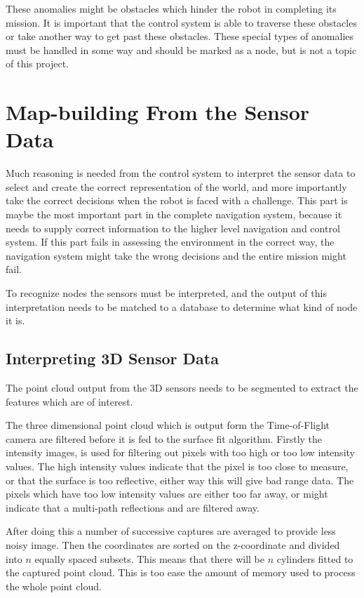 These anomalies might be obstacles which hinder the robot in completing its mission. It is
important that the control system is able to traverse these obstacles or take another way
to get past these obstacles. These special types of anomalies must be handled in some way
and should be marked as a node, but is not a topic of this project. 

\section{Map-building From the Sensor Data}
Much reasoning is needed from the control system to interpret the sensor data to select
and create the correct representation of the world, and more importantly take the correct
decisions when the robot is faced with a challenge. This part is maybe the most important
part in the complete navigation system, because it needs to supply correct information to
the higher level navigation and control system. If this part fails in assessing the
environment in the correct way, the navigation system might take the wrong decisions and
the entire mission might fail. 

To recognize nodes the sensors must be interpreted, and the output of this interpretation
needs to be matched to a database to determine what kind of node it is. 

\subsection{Interpreting 3D Sensor Data}
The point cloud output from the 3D sensors needs to be segmented to extract the features
which are of interest. 

The three dimensional point cloud which is output form the Time-of-Flight camera are
filtered before it is fed to the surface fit algorithm. Firstly the intensity images, is
used for filtering out pixels with too high or too low intensity values. The high
intensity values indicate that the pixel is too close to measure, or that the surface is
too reflective, either way this will give bad range data. The pixels which have too low
intensity values are either too far away, or might indicate that a multi-path reflections
and are filtered away. 

After doing this a number of successive captures are averaged to provide less noisy image.
Then the coordinates are sorted on the z-coordinate and divided into $n$ equally spaced
subsets. This means that there will be $n$ cylinders fitted to the captured point cloud.
This is too ease the amount of memory used to process the whole point cloud. 

